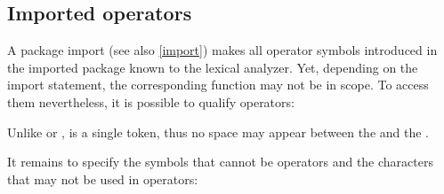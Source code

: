\subsection{Imported operators} \label{importedops}

A package import (see also \autoref{import}) makes all operator symbols introduced in the imported package known to the lexical analyzer. Yet, depending on the import statement, the corresponding function may not be in scope. To access them nevertheless, it is possible to qualify operators:

\begin{flushleft}
 
\end{flushleft}

Unlike  or ,  is a single token, thus no space may appear between the  and the .



It remains to specify the symbols that cannot be operators and the characters that may not be used in operators:

\begin{flushleft}
 \regex{::} \oder{}
   \regex{->} \oder{}
   \regex{<-} \oder{}
   \regex{$\backslash{}|$} \oder{}
   \regex{=} \oder{} %
   \regex{!} \oder{}
   \regex{,} \oder{} \regex{;} \oder{}
    \oder{}
   \regex{$\backslash{}\backslash{}$} \oder{}
   \regex{\_}\\

 \regex{$\backslash{}$(} \oder{} \regex{$\backslash{}$)} \oder{} \regex{$\backslash{}$[} \oder{} \regex{$\backslash{}$]} \oder{} \regex{$\backslash{}$\{} \oder{} \regex{$\backslash{}$\}}\\

 \regex{["'\#`]}\\

\end{flushleft}

